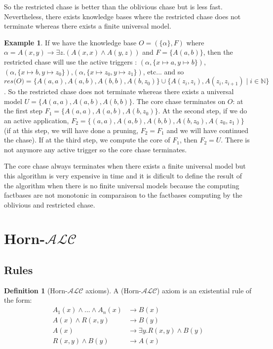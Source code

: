 \documentclass{article}
\theoremstyle{definition}
\newtheorem{definition}{Definition}[section]
\newtheorem{example}{Example}[section]
\theoremstyle{remark}
\def \N {\mathbb N}
\begin{document}
So the restricted chase is better than the oblivious chase but is less fast. Nevertheless, there exists knowledge bases where the restricted chase does not terminate whereas there exists a finite universal model. \begin{example}
If we have the knowledge base $O=(\{\alpha\},F)$ where $\alpha = A(x,y) \rightarrow \exists z.(A(x,x) \wedge A(y,z))$ and $F =  \{A(a,b)\}$, then the restricted chase will use the active triggers : $(\alpha, \{x \mapsto a, y \mapsto b\})$, $(\alpha, \{x \mapsto b, y \mapsto z_0\})$,$(\alpha, \{x \mapsto z_0, y \mapsto z_1\})$, etc... and so  $\textit{res(O)} = \{A(a,a),A(a,b),A(b,b),A(b,z_0)\} \cup \{A(z_i,z_i),A(z_i,z_{i+1})\mid i \in \N\}$. So the restricted chase does not terminate whereas there exists a universal model $U = \{A(a,a),A(a,b),A(b,b)\}$. The core chase terminates on $O$: at the first step $F_1 = \{A(a,a),A(a,b),A(b,z_0)\}$. At the second step, if we do an active application, $F_2 = \{(a,a),A(a,b),A(b,b),A(b,z_0),A(z_0,z_1)\}$ (if at this step, we will have done a pruning, $F_2 = F_1$ and we will have continued the chase). If at the third step, we compute the core of $F_1$, then $F_2 = U$. There is not anymore any active trigger so the core chase terminates. 
\end{example}
The core chase always terminates when there exists a finite universal model but this algorithm is very expensive in time and it is dificult to define the result of the algorithm when there is no finite universal models because the computing factbases are not monotonic in comparaison to the factbases computing by the oblivious and restricted chase.

\section{Horn-$\mathcal{ALC}$}

\subsection{Rules}

\begin{definition}[Horn-$\mathcal{ALC}$ axioms]
A (Horn-$\mathcal{ALC}$) axiom is an existential rule of the form:
\begin{align}
A_1(x) \wedge...\wedge A_n(x) &\rightarrow B(x) \\
A(x) \wedge R(x,y) &\rightarrow B(y) \\
A(x) &\rightarrow \exists y.R(x,y) \wedge B(y) \\
R(x,y) \wedge B(y) &\rightarrow A(x)
\end{align}

\end{definition}
\end{document}
